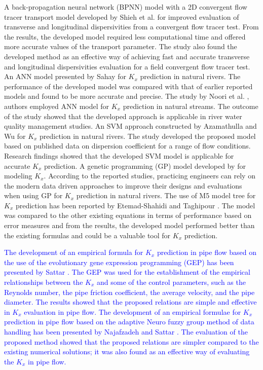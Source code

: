 \documentclass[a4paper,12pt, english]{article}
\begin{document}
A back-propagation neural network (BPNN) model with a 2D convergent flow tracer transport model developed by Shieh et al. \cite{shieh2010development} for improved evaluation of transverse and longitudinal dispersivities from a convergent flow tracer test. From the results, the developed model required less computational time and offered more accurate values of the transport parameter. The study also found the developed method as an effective way of achieving fast and accurate transverse and longitudinal dispersivities evaluation for a field convergent flow tracer test. An ANN model presented by Sahay \cite{sahay2011prediction} for $K_x$ prediction in natural rivers. The performance of the developed model was compared with that of earlier reported models and found to be more accurate and precise. The study by Noori et al. \cite{noori2011framework}, authors employed ANN model for $K_x$ prediction in natural streams. The outcome of the study showed that the developed approach is applicable in river water quality management studies. An SVM approach constructed by Azamathulla and Wu \cite{azamathulla2011support} for $K_x$ prediction in natural rivers. The study developed the proposed model based on published data on dispersion coefficient for a range of flow conditions. Research findings showed that the developed SVM model is applicable for accurate $K_x$ prediction. A genetic programming (GP) model developed by \cite{tu2015ant} for modeling $K_x$. According to the reported studies, practicing engineers can rely on the modern data driven approaches to improve their designs and evaluations when using GP for $K_x$ prediction in natural rivers. The use of M5 model tree for $K_x$ prediction has been reported by Etemad-Shahidi and Taghipour \cite{etemad2012predicting}. The model was compared to the other existing equations in terms of performance based on error measures and from the results, the developed model performed better than the existing formulas and could be a valuable tool for $K_x$ prediction.


\textcolor{blue}{The development of an empirical formula for $K_x$ prediction in pipe flow based on the use of the evolutionary gene expression programming (GEP) has been presented by Sattar \cite{sattar2014gene}. The GEP was used for the establishment of the empirical relationships between the $K_x$ and some of the control parameters, such as the Reynolds number, the pipe friction coefficient, the average velocity, and the pipe diameter. The results showed that the proposed relations are simple and effective in $K_x$ evaluation in pipe flow. The development of an empirical formulae for $K_x$ prediction in pipe flow based on the adaptive Neuro fuzzy group method of data handling has been presented by Najafzadeh and Sattar \cite{najafzadeh2015neuro}. The evaluation of the proposed method showed that the proposed relations are simpler compared to the existing numerical solutions; it was also found as an effective way of evaluating the $K_x$ in pipe flow.}
\end{document}
